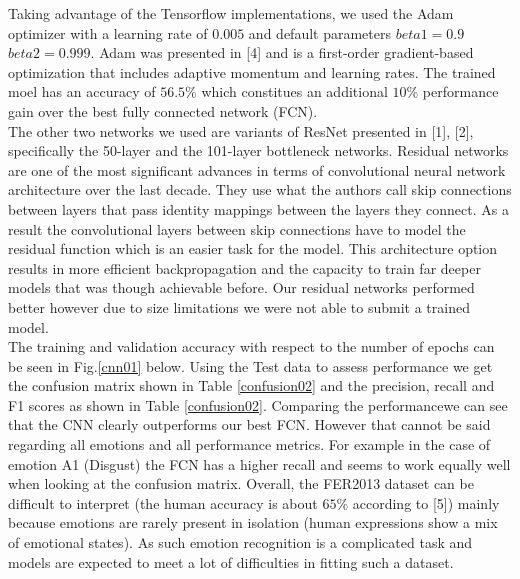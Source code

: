 \documentclass[12pt,twoside]{article}
\begin{document}
Taking advantage of the Tensorflow implementations, we used the Adam optimizer with a learning rate of $0.005$ and default parameters $beta1=0.9$ $beta2=0.999$. Adam was presented in [4] and is a first-order gradient-based optimization that includes adaptive momentum and learning rates. The trained moel has an accuracy of $56.5\%$ which constitues an additional $10\%$ performance gain over the best fully connected network (FCN).\\

The other two networks we used are variants of ResNet presented in [1], [2], specifically the 50-layer and the 101-layer bottleneck networks. Residual networks are one of the most significant advances in terms of convolutional neural network architecture over the last decade. They use what the authors call skip connections between layers that pass identity mappings between the layers they connect. As a result the convolutional layers between skip connections have to model the residual function which is an easier task for the model. This architecture option results in more efficient backpropagation and the capacity to train far deeper models that was though achievable before. Our residual networks performed better however due to size limitations we were not able to submit a trained model.\\

The training and validation accuracy with respect to the number of epochs can be seen in Fig.\ref{cnn01} below. Using the Test data to assess performance we get the confusion matrix shown in Table \ref{confusion02} and the precision, recall and F1 scores as shown in Table \ref{confusion02}. Comparing the performancewe can see that the CNN clearly outperforms our best FCN. However that cannot be said regarding all emotions and all performance metrics. For example in the case of emotion A1 (Disgust) the FCN has a higher recall and seems to work equally well when looking at the confusion matrix. Overall, the FER2013 dataset can be difficult to interpret (the human accuracy is about $65\%$ according to [5]) mainly because emotions are rarely present in isolation (human expressions show a mix of emotional states). As such emotion recognition is a complicated task and models are expected to meet a lot of difficulties in fitting such a dataset.
\end{document}
